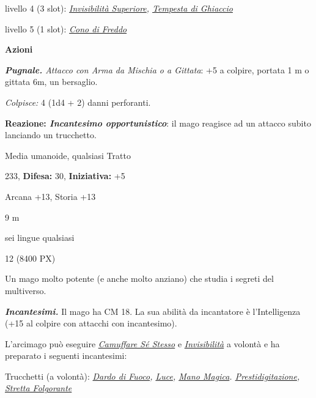 \begin{multicols}{2}
{livello 4 (3 slot): \emph{\hyperlink{Invisibilità Superiore}{Invisibilità Superiore}, \hyperlink{Tempesta di Ghiaccio}{Tempesta di Ghiaccio}}

livello 5 (1 slot): \emph{\hyperlink{Cono di Freddo}{Cono di Freddo}}

\textbf{Azioni}

\emph{\textbf{Pugnale.} Attacco con Arma da Mischia o a Gittata}: +5 a colpire, portata 1 m o gittata 6m, un bersaglio.

\emph{Colpisce:} 4 (1d4 + 2) danni perforanti.

\textbf{Reazione: \emph{Incantesimo opportunistico}}: il mago reagisce ad un attacco subito lanciando un trucchetto.

\begin{description}[noitemsep, topsep=0pt, parsep=0pt, partopsep=0pt, leftmargin=0cm, labelwidth=2.2cm]
    \item[\textbf{Taglia/Tipo:}] Media umanoide, qualsiasi Tratto
    \item[\textbf{Caratt.:}] 
    \item[\textbf{Punti Ferita:}] 233,  \textbf{Difesa:} 30,  \textbf{Iniziativa:} +5
    \item[\textbf{Comp.:}] Arcana +13, Storia +13
    \item[\textbf{Tiri Salvez.:}] 
    \item[\textbf{Movimento:}] 9 m
    \item[\textbf{Linguaggi:}] sei lingue qualsiasi
    \item[\textbf{Sfida:}] 12 (8400 PX)\smallskip
\end{description}

Un mago molto potente (e anche molto anziano) che studia i segreti del multiverso.

\emph{\textbf{Incantesimi.}} Il mago ha CM 18. La sua abilità da incantatore è l'Intelligenza (+15 al colpire con attacchi con incantesimo).

L'arcimago può eseguire \emph{\hyperlink{Camuffare Sé Stesso}{Camuffare Sé Stesso}} e \emph{\hyperlink{Invisibilità}{Invisibilità}} a volontà e ha preparato i seguenti incantesimi:

Trucchetti (a volontà): \emph{\hyperlink{Dardo di Fuoco}{Dardo di Fuoco}, \hyperlink{Luce}{Luce}, \hyperlink{Mano Magica}{Mano Magica}. \hyperlink{Prestidigitazione}{Prestidigitazione}, \hyperlink{Stretta Folgorante}{Stretta Folgorante}}

}
\end{multicols}
